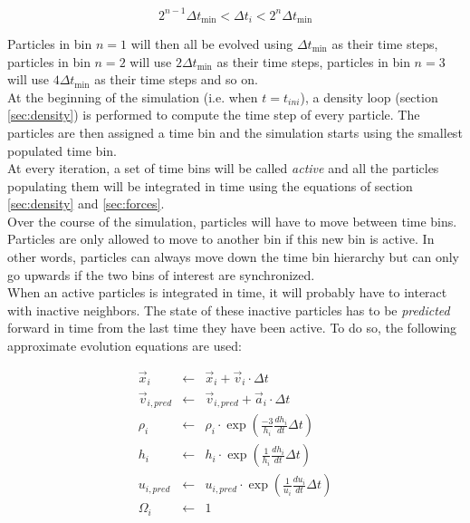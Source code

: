 \documentclass[a4paper,10pt]{article}
\begin{document}
\begin{equation}
2^{n-1} \Delta t_{\min}  < \Delta t_i < 2^n\Delta t_{\min} 
\end{equation}

Particles in bin $n=1$ will then all be evolved using $\Delta t_{\min}$ as their time steps, particles in bin $n=2$
will use $2\Delta t_{\min}$ as their time steps, particles in bin $n=3$
will use $4\Delta t_{\min}$ as their time steps and so on. \\

At the beginning of the simulation (i.e. when $t=t_{ini}$), a density loop (section
\ref{sec:density}) is performed to compute the time step of every particle. The particles are then assigned a time bin
and the simulation starts using the smallest populated time bin. \\
At every iteration, a set of time bins will be called \emph{active} and all the particles populating them will be
integrated in time using the equations of section \ref{sec:density} and \ref{sec:forces}.\\
 Over the course of the
simulation, particles will have to move between time bins. Particles are only allowed to move to another bin if this
new bin is active. In other words, particles can always move down the time bin hierarchy but can only go upwards if the
two bins of interest are synchronized.\\

When an active particles is integrated in time, it will probably have to interact with inactive neighbors. The state
of these inactive particles has to be \emph{predicted} forward in time from the last time they have been active. To do
so, the following approximate evolution equations are used:

\begin{eqnarray}
 \vec{x}_i &\leftarrow& \vec{x}_{i} + \vec{v}_i \cdot \Delta t \\
 \vec{v}_{i,pred} &\leftarrow& \vec{v}_{i,pred} + \vec{a}_i \cdot \Delta t \\
 \rho_i &\leftarrow& \rho_i \cdot \exp\left(\frac{-3}{h_i}  \frac{dh_i}{dt} \Delta t \right) \\
  h_i &\leftarrow& h_i \cdot \exp\left(\frac{1}{h_i}  \frac{dh_i}{dt} \Delta t \right) \\
  u_{i,pred} &\leftarrow& u_{i,pred} \cdot \exp\left(\frac{1}{u_i}\frac{du_i}{dt} \Delta t\right) \\
  \Omega_i &\leftarrow& 1 
\end{eqnarray}
\end{document}
